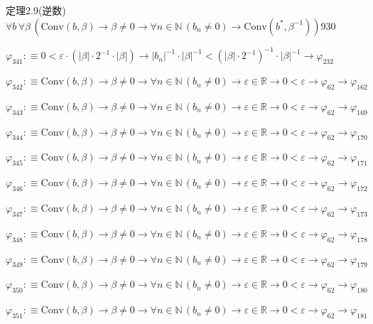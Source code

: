 \begin{fullproof}{定理2.9(逆数)}{$\forall b\,\forall \beta\,(\mathrm{Conv}(b,\beta) \to \beta \neq 0 \to \forall n \in \mathbb{N}\,(b_{n} \neq 0) \to \mathrm{Conv}(b^{\ast},\beta^{-1}))$}{930}
\begin{abbrevlist}
\item $\varphi_{341} :\equiv 0 < \varepsilon \cdot (\lvert \beta \rvert \cdot 2^{-1} \cdot \lvert \beta \rvert) \to \lvert b_{n} \rvert^{-1} \cdot \lvert \beta \rvert^{-1} < (\lvert \beta \rvert \cdot 2^{-1})^{-1} \cdot \lvert \beta \rvert^{-1} \to \varphi_{232}$
\item $\varphi_{342} :\equiv \mathrm{Conv}(b,\beta) \to \beta \neq 0 \to \forall n \in \mathbb{N}\,(b_{n} \neq 0) \to \varepsilon \in \mathbb{R} \to 0 < \varepsilon \to \varphi_{62} \to \varphi_{162}$
\item $\varphi_{343} :\equiv \mathrm{Conv}(b,\beta) \to \beta \neq 0 \to \forall n \in \mathbb{N}\,(b_{n} \neq 0) \to \varepsilon \in \mathbb{R} \to 0 < \varepsilon \to \varphi_{62} \to \varphi_{169}$
\item $\varphi_{344} :\equiv \mathrm{Conv}(b,\beta) \to \beta \neq 0 \to \forall n \in \mathbb{N}\,(b_{n} \neq 0) \to \varepsilon \in \mathbb{R} \to 0 < \varepsilon \to \varphi_{62} \to \varphi_{170}$
\item $\varphi_{345} :\equiv \mathrm{Conv}(b,\beta) \to \beta \neq 0 \to \forall n \in \mathbb{N}\,(b_{n} \neq 0) \to \varepsilon \in \mathbb{R} \to 0 < \varepsilon \to \varphi_{62} \to \varphi_{171}$
\item $\varphi_{346} :\equiv \mathrm{Conv}(b,\beta) \to \beta \neq 0 \to \forall n \in \mathbb{N}\,(b_{n} \neq 0) \to \varepsilon \in \mathbb{R} \to 0 < \varepsilon \to \varphi_{62} \to \varphi_{172}$
\item $\varphi_{347} :\equiv \mathrm{Conv}(b,\beta) \to \beta \neq 0 \to \forall n \in \mathbb{N}\,(b_{n} \neq 0) \to \varepsilon \in \mathbb{R} \to 0 < \varepsilon \to \varphi_{62} \to \varphi_{173}$
\item $\varphi_{348} :\equiv \mathrm{Conv}(b,\beta) \to \beta \neq 0 \to \forall n \in \mathbb{N}\,(b_{n} \neq 0) \to \varepsilon \in \mathbb{R} \to 0 < \varepsilon \to \varphi_{62} \to \varphi_{178}$
\item $\varphi_{349} :\equiv \mathrm{Conv}(b,\beta) \to \beta \neq 0 \to \forall n \in \mathbb{N}\,(b_{n} \neq 0) \to \varepsilon \in \mathbb{R} \to 0 < \varepsilon \to \varphi_{62} \to \varphi_{179}$
\item $\varphi_{350} :\equiv \mathrm{Conv}(b,\beta) \to \beta \neq 0 \to \forall n \in \mathbb{N}\,(b_{n} \neq 0) \to \varepsilon \in \mathbb{R} \to 0 < \varepsilon \to \varphi_{62} \to \varphi_{180}$
\item $\varphi_{351} :\equiv \mathrm{Conv}(b,\beta) \to \beta \neq 0 \to \forall n \in \mathbb{N}\,(b_{n} \neq 0) \to \varepsilon \in \mathbb{R} \to 0 < \varepsilon \to \varphi_{62} \to \varphi_{181}$

\end{abbrevlist}
\end{fullproof}
